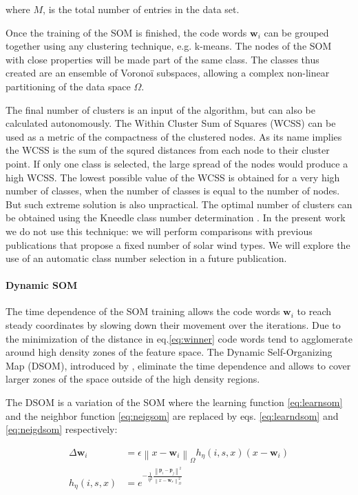 where $M$, is the total number of entries in the data set.

Once the training of the SOM is finished, the code words $\boldsymbol{w}_i$ can be grouped together using any clustering technique, e.g. k-means. The nodes of the SOM with close properties will be made part of the same class. The classes thus created are an ensemble of Vorono\"i subspaces, allowing a complex non-linear partitioning of the data space $\Omega$.

The final number of clusters is an input of the algorithm, but can also be calculated autonomously. The Within Cluster Sum of Squares (WCSS) can be used as a metric of the compactness of the clustered nodes. As its name implies the WCSS is the sum of the squred distances from each node to their cluster point. If only one class is selected, the large spread of the nodes would produce a high WCSS. The lowest possible value of the WCSS is obtained for a very high number of classes, when the number of classes is equal to the number of nodes. But such extreme solution is also unpractical. The optimal number of clusters can be obtained using the Kneedle class number determination \citep{5961514}. In the present work we do not use this technique: we will perform comparisons with previous publications that propose a fixed number of solar wind types. We will explore the use of an automatic class number selection in a future publication.

\paragraph{Dynamic SOM}
The time dependence of the SOM training allows the code words $\boldsymbol{w}_i$ to reach steady coordinates by slowing down their movement over the iterations. Due to the minimization of the distance in eq.\eqref{eq:winner} code words tend to agglomerate around high density zones of the feature space. The Dynamic Self-Organizing Map (DSOM), introduced by \citep{Rougier2011}, eliminate the time dependence and allows to cover larger zones of the space outside of the high density regions.

The DSOM is a variation of the SOM where the learning function \eqref{eq:learnsom} and the neighbor function \eqref{eq:neigsom} are replaced by eqs. \eqref{eq:learndsom} and \eqref{eq:neigdsom} respectively:

\begin{align}
\Delta \boldsymbol{w}_i & = \epsilon \left\lVert x - \boldsymbol{w}_i \right\rVert_\Omega h_\eta(i,s,x)(x-\boldsymbol{w}_i) \label{eq:learndsom} \\
h_\eta(i,s,x) & = e^{-\frac{1}{\eta^2}\frac{\left\lVert \boldsymbol{p}_i - \boldsymbol{p}_j \right\rVert^2}{\left\lVert x - \boldsymbol{w}_s \right\rVert_\Omega^2}} \label{eq:neigdsom} 
\end{align}

